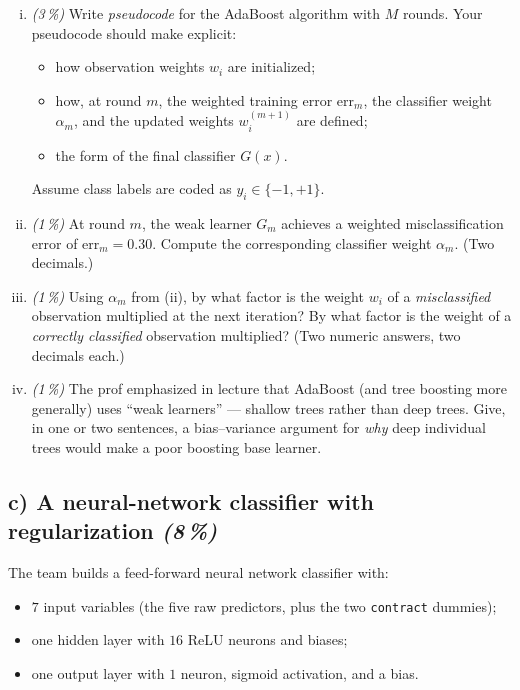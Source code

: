 \documentclass[11pt,a4paper]{article}
\newcommand{\subpoints}[1]{\textit{(#1\,\%)}}
\begin{document}
\begin{enumerate}[(i)]
  \item \subpoints{3} Write \emph{pseudocode} for the AdaBoost algorithm with $M$ rounds. Your pseudocode should make explicit:
  \begin{itemize}
    \item how observation weights $w_i$ are initialized;
    \item how, at round $m$, the weighted training error $\mathrm{err}_m$, the classifier weight $\alpha_m$, and the updated weights $w_i^{(m+1)}$ are defined;
    \item the form of the final classifier $G(x)$.
  \end{itemize}
  Assume class labels are coded as $y_i\in\{-1,+1\}$.
  \item \subpoints{1} At round $m$, the weak learner $G_m$ achieves a weighted misclassification error of $\mathrm{err}_m = 0.30$. Compute the corresponding classifier weight $\alpha_m$. (Two decimals.)
  \item \subpoints{1} Using $\alpha_m$ from (ii), by what factor is the weight $w_i$ of a \emph{misclassified} observation multiplied at the next iteration? By what factor is the weight of a \emph{correctly classified} observation multiplied? (Two numeric answers, two decimals each.)
  \item \subpoints{1} The prof emphasized in lecture that AdaBoost (and tree boosting more generally) uses ``weak learners'' --- shallow trees rather than deep trees. Give, in one or two sentences, a bias--variance argument for \emph{why} deep individual trees would make a poor boosting base learner.
\end{enumerate}

\subsection*{c) A neural-network classifier with regularization \subpoints{8}}

The team builds a feed-forward neural network classifier with:
\begin{itemize}
  \item $7$ input variables (the five raw predictors, plus the two \texttt{contract} dummies);
  \item one hidden layer with $16$ ReLU neurons and biases;
  \item one output layer with $1$ neuron, sigmoid activation, and a bias.
\end{itemize}
\end{document}
